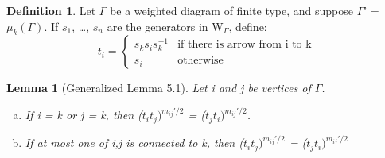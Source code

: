 \documentclass[11pt]{amsart}
\newtheorem{lem}[thm]{Lemma}
\theoremstyle{definition}
\newtheorem{defn}[thm]{Definition}
\begin{document}
\begin{defn} Let $\Gamma$ be a weighted diagram of finite type, and suppose $\Gamma$' = $\mu_{k}(\Gamma)$. If $s_1$, \dots, $s_n$ are the generators in W$_{\Gamma}$, define: 
$$t_{i} =
\begin{cases}
s_{k}s_{i}s_{k}^{-1} & \text{if there is arrow from i to k} \\
s_{i} & \text{otherwise}
\end{cases}$$
\end{defn}

\begin{lem}[Generalized Lemma 5.1]\label{lem:one_connected_to_k} Let i and j be vertices of $\Gamma$.
\begin{enumerate}[(a)]
\item If i = k or j = k, then ($t_{i}t_{j})^{m_{ij}'/2}$ = ($t_{j}t_{i})^{m_{ij}'/2}$.
\item If at most one of i,j is connected to k, then ($t_{i}t_{j})^{m_{ij}'/2}$ = ($t_{j}t_{i})^{m_{ij}'/2}$
\end{enumerate}
\end{lem}
\end{document}
